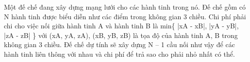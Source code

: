 Một đế chế đang xây dựng mạng lưới cho các hành tinh trong nó. Đế chế gồm có N hành tinh được biểu diễn như các điểm trong không gian 3 chiều. Chi phí phải chi cho việc nối giữa hành tinh A và hành tinh B là min\{ |xA - xB|, |yA - yB|, |zA - zB| \} với (xA, yA, zA), (xB, yB, zB) là tọa độ của hành tinh A, B trong không gian 3 chiều. Đế chế dự tính sẽ xây dựng N – 1 cầu nối như vậy để các hành tinh liên thông với nhau và chi phí để trả sao cho phải nhỏ nhất có thể.